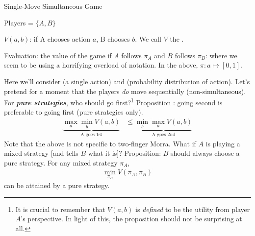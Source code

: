 \documentclass[11pt]{article}
\newcommand\myspace[1][]{\vspace{#1\bigskipamount}\Needspace{10\baselineskip}}
\begin{document}
\myspace
\begin{itemdefinition}{Single-Move Simultaneous Game }
	\item Players = $\{A, B\}$
	\item $V(a, b)$:  if A chooses action $a$, B chooses $b$. We call $V$ the .
	\item Evaluation: the value of the game if $A$ follows $\pi_A$ and $B$ follows $\pi_B$:
where we seem to be using a horrifying overload of notation. In the above, $\pi: a \mapsto [0, 1]$. 
\end{itemdefinition}
Here we'll consider  (a single action) and  (probability distribution of action).  Let's pretend for a moment that the players \textit{do} move sequentially (non-simultaneous). For \underline{\textbf{\textit{pure strategies}}}, who should go first?\footnote{It is crucial to remember that $V(a, b)$ is \textit{defined} to be the utility from player $A$'s perspective. In light of this, the proposition should not be surprising at all.} Proposition : going second is preferable to going first (pure strategies only). 
\begin{align}
	\underbrace{ \max_a \min_b V(a, b) }_\text{A goes 1st} &\le 
	\underbrace{ \min_b \max_a V(a, b) }_\text{A goes 2nd}
\end{align}
Note that the above is not specific to two-finger Morra. What if $A$ is playing a mixed strategy [and tells $B$ what it is]? Proposition: $B$ should always choose a pure strategy. For any mixed strategy $\pi_A$, 
\begin{align}
	\min_{\pi_B} V(\pi_A, \pi_B)
\end{align}
can be attained by a pure strategy. \\
\end{document}

